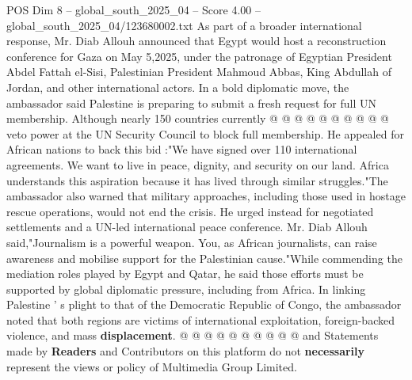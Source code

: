 \begin{textsample}{POS Dim 8 – global\_south\_2025\_04 – Score 4.00 – global\_south\_2025\_04/123680002.txt}
As part of a broader international response, Mr.
Diab Allouh announced that Egypt would host a reconstruction conference for Gaza on May 5,2025, under the patronage of Egyptian President Abdel Fattah el-Sisi, Palestinian President Mahmoud Abbas, King Abdullah of Jordan, and other international actors.
In a bold diplomatic move, the ambassador said Palestine is preparing to submit a fresh request for full UN membership.
Although nearly 150 countries currently @ @ @ @ @ @ @ @ @ @ veto power at the UN Security Council to block full membership.
He appealed for African nations to back this bid :"We have signed over 110 international agreements.
We want to live in peace, dignity, and security on our land.
Africa understands this aspiration because it has lived through similar struggles."The ambassador also warned that military approaches, including those used in hostage rescue operations, would not end the crisis.
He urged instead for negotiated settlements and a UN-led international peace conference.
Mr.
Diab Allouh said,"Journalism is a powerful weapon.
You, as African journalists, can raise awareness and mobilise support for the Palestinian cause."While commending the mediation roles played by Egypt and Qatar, he said those efforts must be supported by global diplomatic pressure, including from Africa.
In linking Palestine ' s plight to that of the Democratic Republic of Congo, the ambassador noted that both regions are victims of international exploitation, foreign-backed violence, and mass \textbf{displacement}. @ @ @ @ @ @ @ @ @ @ and Statements made by \textbf{Readers} and Contributors on this platform do not \textbf{necessarily} represent the views or policy of Multimedia Group Limited.

\end{textsample}
